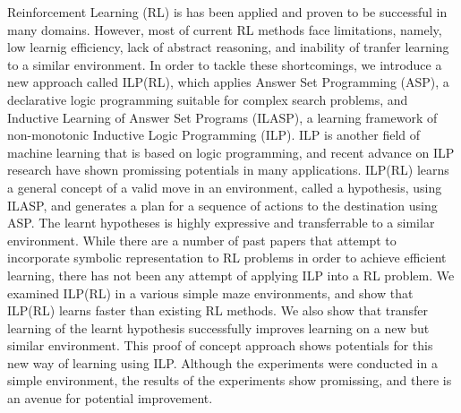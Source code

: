 Reinforcement Learning (RL) is has been applied and proven to be successful in many domains.
However, most of current RL methods face limitations, namely, low learnig efficiency, lack of abstract reasoning, and inability of tranfer learning to a similar environment.
In order to tackle these shortcomings, we introduce a new approach called ILP(RL), 
which applies Answer Set Programming (ASP), a declarative logic programming suitable for complex search problems, 
and Inductive Learning of Answer Set Programs (ILASP), a learning framework of non-monotonic Inductive Logic Programming (ILP).
ILP is another field of machine learning that is based on logic programming, and recent advance on ILP research have shown promissing potentials in many applications.
ILP(RL) learns a general concept of a valid move in an environment, called a hypothesis, using ILASP, and generates a plan for a sequence of actions to the destination using ASP.
The learnt hypotheses is highly expressive and transferrable to a similar environment. 
While there are a number of past papers that attempt to incorporate symbolic representation to RL problems in order to achieve efficient learning, 
there has not been any attempt of applying ILP into a RL problem.
We examined ILP(RL) in a various simple maze environments, and show that ILP(RL) learns faster than existing RL methods.
We also show that transfer learning of the learnt hypothesis successfully improves learning on a new but similar environment.
This proof of concept approach shows potentials for this new way of learning using ILP.
Although the experiments were conducted in a simple environment, the results of the experiments show promissing, and there is an avenue for potential improvement.
